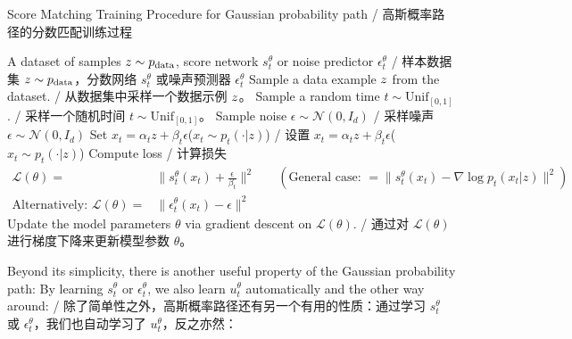 \begin{algorithm}[h]
\caption{Score Matching Training Procedure for Gaussian probability path / 高斯概率路径的分数匹配训练过程}
\label{alg:training_score_matching_gaussian_paths}
\begin{algorithmic}[1]
\REQUIRE A dataset of samples $z\sim p_{\rm{data}}$, score network $s_t^\theta$ or noise predictor $\epsilon_t^\theta$ / 样本数据集 $z\sim p_{\rm{data}}$，分数网络 $s_t^\theta$ 或噪声预测器 $\epsilon_t^\theta$
    \STATE Sample a data example $z$ from the dataset. / 从数据集中采样一个数据示例 $z$。
    \STATE Sample a random time $t \sim \text{Unif}_{[0,1]}$. / 采样一个随机时间 $t \sim \text{Unif}_{[0,1]}$。
    \STATE Sample noise $\epsilon\sim\mathcal{N}(0,I_d)$ / 采样噪声 $\epsilon\sim\mathcal{N}(0,I_d)$
    \STATE Set $x_t=\alpha_t z + \beta_t\epsilon$\hfill ($x_t\sim p_t(\cdot|z)$) / 设置 $x_t=\alpha_t z + \beta_t\epsilon$\hfill ($x_t\sim p_t(\cdot|z)$)
    \STATE Compute loss / 计算损失
    \begin{align*}
        \mathcal{L}(\theta) =& \|s_t^\theta(x_t)+\frac{\epsilon}{\beta_t}\|^2 \quad &(\text{General case: }=\|s_t^\theta(x_t)-\nabla\log p_t(x_t|z)\|^2)\\
    \text{Alternatively: }\mathcal{L}(\theta) =& \|\epsilon_t^\theta(x_t)-\epsilon\|^2
    \end{align*}
    \STATE Update the model parameters $\theta$ via gradient descent on $\mathcal{L}(\theta)$. / 通过对 $\mathcal{L}(\theta)$ 进行梯度下降来更新模型参数 $\theta$。
\ENDFOR
\end{algorithmic}
\end{algorithm}
Beyond its simplicity, there is another useful property of the Gaussian probability path: By learning $s_t^\theta$ or $\epsilon_t^\theta$, we also learn $u_t^\theta$ automatically and the other way around: / 除了简单性之外，高斯概率路径还有另一个有用的性质：通过学习 $s_t^\theta$ 或 $\epsilon_t^\theta$，我们也自动学习了 $u_t^\theta$，反之亦然：


